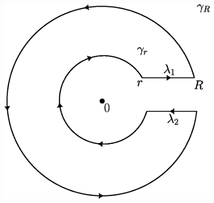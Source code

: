 \begin{example}
\begin{enumerate}
            \begin{figure}[h]
               \centering
               \includegraphics[scale=0.5]{Figures/Chapter5/contour_3.eps}
               \caption{}
               \label{figure_5.5}
           \end{figure}


\end{enumerate}
\end{example}
